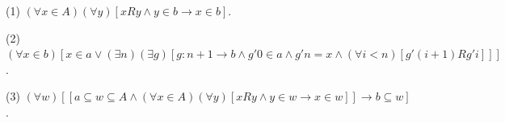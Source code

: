 (1) $(\forall x \in A)(\forall y)[x R y \land y \in b \rightarrow x \in b]$.

(2) $(\forall x \in b)[x \in a \lor (\exists n)(\exists g)[g : n + 1 \rightarrow b \land g'0 \in a \land g'n = x \land (\forall i < n)[g'(i + 1) R g'i]]]$.

(3) $(\forall w)[[a \subseteq w \subseteq A \land (\forall x \in A)(\forall y)[x R y \land y \in w \rightarrow x \in w]] \rightarrow b \subseteq w]$.

